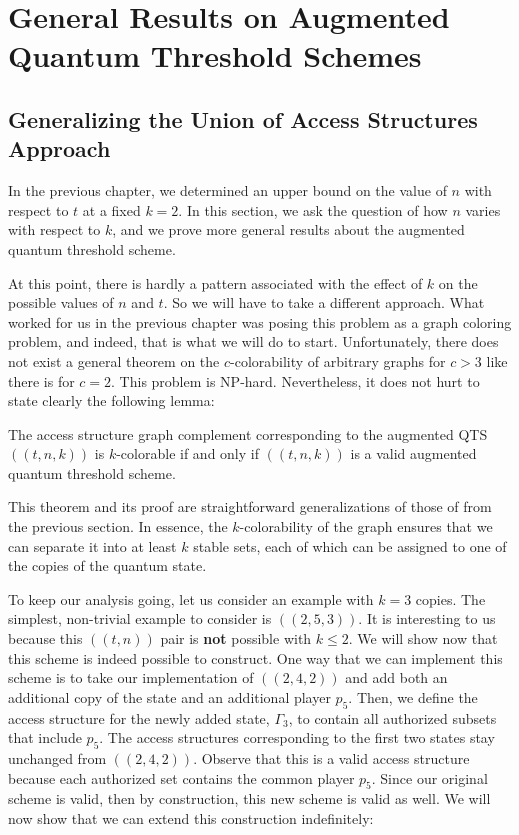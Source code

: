 \chapter{General Results on Augmented Quantum Threshold Schemes}

\section{Generalizing the Union of Access Structures Approach}

In the previous chapter, we determined an upper bound on the value of $n$ with respect to $t$ at a fixed $k=2$. In this section, we ask the question of how $n$ varies with respect to $k$, and we prove more general results about the augmented quantum threshold scheme. 

At this point, there is hardly a pattern associated with the effect of $k$ on the possible values of $n$ and $t$. So we will have to take a different approach. What worked for us in the previous chapter was posing this problem as a graph coloring problem, and indeed, that is what we will do to start. Unfortunately, there does not exist a general theorem on the $c$-colorability of arbitrary graphs for $c > 3$ like there is for $c=2$. This problem is NP-hard. Nevertheless, it does not hurt to state clearly the following lemma:

\begin{lemma}
    \label{lem:k-color-access}
    The access structure graph complement corresponding to the augmented QTS $((t,n,k))$ is $k$-colorable if and only if $((t,n,k))$ is a valid augmented quantum threshold scheme.
\end{lemma}

This theorem and its proof are straightforward generalizations of those of  from the previous section. In essence, the $k$-colorability of the graph ensures that we can separate it into at least $k$ stable sets, each of which can be assigned to one of the copies of the quantum state.

To keep our analysis going, let us consider an example with $k=3$ copies. The simplest, non-trivial example to consider is $((2,5,3))$. It is interesting to us because this $((t,n))$ pair is \textbf{not} possible with $k \leq 2$. We will show now that this scheme is indeed possible to construct. One way that we can implement this scheme is to take our implementation of $((2,4,2))$ and add both an additional copy of the state and an additional player $p_5$. Then, we define the access structure for the newly added state, $\Gamma_3$, to contain all authorized subsets that include $p_5$. The access structures corresponding to the first two states stay unchanged from $((2,4,2))$. Observe that this is a valid access structure because each authorized set contains the common player $p_5$. Since our original scheme is valid, then by construction, this new scheme is valid as well. We will now show that we can extend this construction indefinitely:

